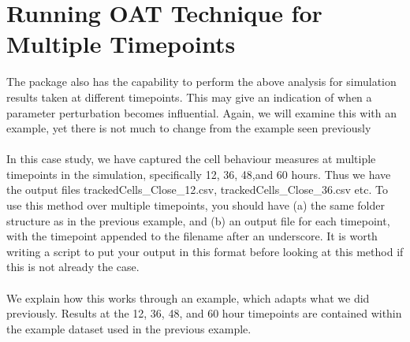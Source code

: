 \documentclass[a4paper,11pt]{article}
\begin{document}
\section{Running OAT Technique for Multiple Timepoints}
\noindent The package also has the capability to perform the above analysis for simulation results taken at different timepoints. This may give an indication of when a parameter perturbation becomes influential.  Again, we will examine this with an example, yet there is not much to change from the example seen previously\\
\\
In this case study, we have captured the cell behaviour measures at multiple timepoints in the simulation, specifically 12, 36, 48,and 60 hours. Thus we have the output files trackedCells\_Close\_12.csv, trackedCells\_Close\_36.csv etc. To use this method over multiple timepoints, you should have (a) the same folder structure as in the previous example, and (b) an output file for each timepoint, with the timepoint appended to the filename after an underscore. It is worth writing a script to put your output in this format before looking at this method if this is not already the case.\\
\\
We explain how this works through an example, which adapts what we did previously. Results at the 12, 36, 48, and 60 hour timepoints are contained within the example dataset used in the previous example.
\end{document}
